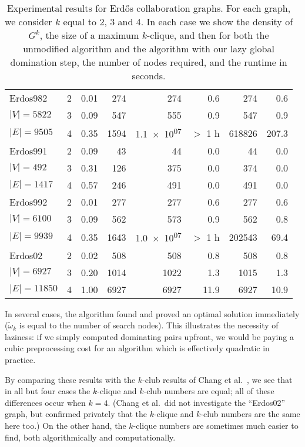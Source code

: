 \documentclass[letterpaper]{article}
\begin{document}
\begin{table}
\begin{tabular}{l c rr rr rr}
Erdos982  & 2&0.01&274&274&0.6&274&0.6\\
\hspace*{0.2em}\color{gray}$|V|{=}5822$& 3&0.09&547&555&0.9&547&0.9\\
\hspace*{0.2em}\color{gray}$|E|{=}9505$& 4&0.35&1594&\color{gray}\num{1.1e+07}&\color{gray}$>$ 1 h&618826&207.3\\
Erdos991  & 2&0.09&43&44&0.0&44&0.0\\
\hspace*{0.2em}\color{gray}$|V|{=}492$& 3&0.31&126&375&0.0&374&0.0\\
\hspace*{0.2em}\color{gray}$|E|{=}1417$& 4&0.57&246&491&0.0&491&0.0\\
Erdos992  & 2&0.01&277&277&0.6&277&0.6\\
\hspace*{0.2em}\color{gray}$|V|{=}6100$& 3&0.09&562&573&0.9&562&0.8\\
\hspace*{0.2em}\color{gray}$|E|{=}9939$& 4&0.35&1643&\color{gray}\num{1.0e+07}&\color{gray}$>$ 1 h&202543&69.4\\
Erdos02  & 2&0.02&508&508&0.8&508&0.8\\
\hspace*{0.2em}\color{gray}$|V|{=}6927$& 3&0.20&1014&1022&1.3&1015&1.3\\
\hspace*{0.2em}\color{gray}$|E|{=}11850$& 4&1.00&6927&6927&11.9&6927&10.9\\
    \bottomrule
\end{tabular}
\caption{Experimental results for Erd\H{o}s collaboration graphs. For each
graph, we consider $k$ equal to 2, 3 and 4. In each case we show the density of
$G^k$, the size of a maximum $k$-clique, and then for both the unmodified
algorithm and the algorithm with our lazy global domination step, the number of
nodes required, and the runtime in seconds.}\label{table:erdos}
\end{table}

In several cases, the algorithm found and proved an optimal solution immediately ($\tilde{\omega}_k$
is equal to the number of search nodes). This illustrates the necessity of laziness: if we simply
computed dominating pairs upfront, we would be paying a cubic preprocessing cost for an algorithm
which is effectively quadratic in practice.

By comparing these results with the $k$-club results of Chang et al.\ , we see
that in all but four cases the $k$-clique and $k$-club numbers are equal; all of these differences
occur when $k = 4$. (Chang et al.\ did not investigate the ``Erdos02'' graph, but
\citeauthor{Wotzlaw:2014} confirmed privately that the $k$-clique and $k$-club numbers are the same
here too.) On the other hand, the $k$-clique numbers are sometimes much easier to find, both
algorithmically and computationally.
\end{document}
